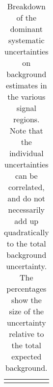 \begin{table}
\begin{center}
\begin{tabular*}{\textwidth}{@{\extracolsep{\fill}}lcccc}
\noalign{\smallskip}\hline\noalign{\smallskip}
\end{tabular*}
\end{center}
\caption[Breakdown of uncertainty on background estimates]{
Breakdown of the dominant systematic uncertainties on background estimates in the various signal regions.
Note that the individual uncertainties can be correlated, and do not necessarily add up quadratically to 
the total background uncertainty. The percentages show the size of the uncertainty relative to the total expected background.
\label{table.results.bkgestimate.uncertainties.SR1_FGD1_FHC_SR1_FGD1_RHC_SR1_FGD2_FHC_SR1_FGD2_RHC}}
\end{table}
%
